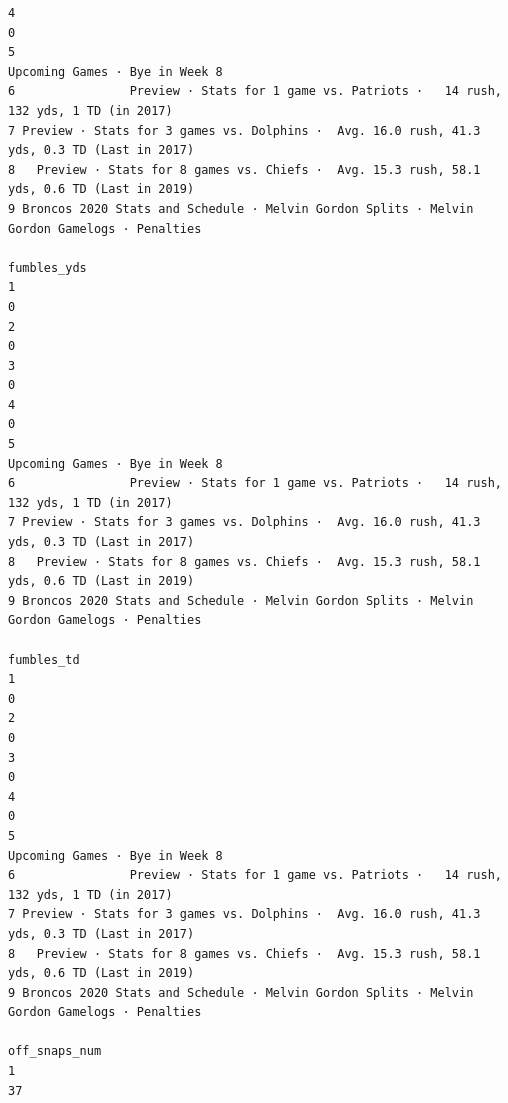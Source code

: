 \documentclass[
]{article}
\begin{document}
\begin{verbatim}
4                                                                                           0
5                                                              Upcoming Games · Bye in Week 8
6                Preview · Stats for 1 game vs. Patriots ·   14 rush, 132 yds, 1 TD (in 2017)
7 Preview · Stats for 3 games vs. Dolphins ·  Avg. 16.0 rush, 41.3 yds, 0.3 TD (Last in 2017)
8   Preview · Stats for 8 games vs. Chiefs ·  Avg. 15.3 rush, 58.1 yds, 0.6 TD (Last in 2019)
9 Broncos 2020 Stats and Schedule · Melvin Gordon Splits · Melvin Gordon Gamelogs · Penalties
                                                                                  fumbles_yds
1                                                                                           0
2                                                                                           0
3                                                                                           0
4                                                                                           0
5                                                              Upcoming Games · Bye in Week 8
6                Preview · Stats for 1 game vs. Patriots ·   14 rush, 132 yds, 1 TD (in 2017)
7 Preview · Stats for 3 games vs. Dolphins ·  Avg. 16.0 rush, 41.3 yds, 0.3 TD (Last in 2017)
8   Preview · Stats for 8 games vs. Chiefs ·  Avg. 15.3 rush, 58.1 yds, 0.6 TD (Last in 2019)
9 Broncos 2020 Stats and Schedule · Melvin Gordon Splits · Melvin Gordon Gamelogs · Penalties
                                                                                   fumbles_td
1                                                                                           0
2                                                                                           0
3                                                                                           0
4                                                                                           0
5                                                              Upcoming Games · Bye in Week 8
6                Preview · Stats for 1 game vs. Patriots ·   14 rush, 132 yds, 1 TD (in 2017)
7 Preview · Stats for 3 games vs. Dolphins ·  Avg. 16.0 rush, 41.3 yds, 0.3 TD (Last in 2017)
8   Preview · Stats for 8 games vs. Chiefs ·  Avg. 15.3 rush, 58.1 yds, 0.6 TD (Last in 2019)
9 Broncos 2020 Stats and Schedule · Melvin Gordon Splits · Melvin Gordon Gamelogs · Penalties
                                                                                off_snaps_num
1                                                                                          37

\end{verbatim}
\end{document}
